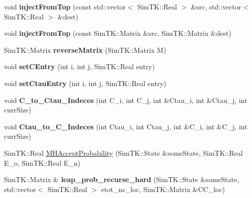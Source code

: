 \begin{DoxyCompactItemize}
\item 
void {\bfseries inject\+From\+Top} (const std\+::vector$<$ Sim\+T\+K\+::\+Real $>$ \&src, std\+::vector$<$ Sim\+T\+K\+::\+Real $>$ \&dest)\hypertarget{classLAHMCSampler_aedd525ca52d9d2a785b851a1480bb0db}{}\label{classLAHMCSampler_aedd525ca52d9d2a785b851a1480bb0db}

\item 
void {\bfseries inject\+From\+Top} (const Sim\+T\+K\+::\+Matrix \&src, Sim\+T\+K\+::\+Matrix \&dest)\hypertarget{classLAHMCSampler_ab0e8be72dae629b8de3e17efe1eea6e8}{}\label{classLAHMCSampler_ab0e8be72dae629b8de3e17efe1eea6e8}

\item 
Sim\+T\+K\+::\+Matrix {\bfseries reverse\+Matrix} (Sim\+T\+K\+::\+Matrix M)\hypertarget{classLAHMCSampler_a6aefd73ab099cdc45a3c999a35871ea0}{}\label{classLAHMCSampler_a6aefd73ab099cdc45a3c999a35871ea0}

\item 
void {\bfseries set\+C\+Entry} (int i, int j, Sim\+T\+K\+::\+Real entry)\hypertarget{classLAHMCSampler_a100856ce2d65a5c3af4a4fa23d03cec2}{}\label{classLAHMCSampler_a100856ce2d65a5c3af4a4fa23d03cec2}

\item 
void {\bfseries set\+Ctau\+Entry} (int i, int j, Sim\+T\+K\+::\+Real entry)\hypertarget{classLAHMCSampler_a9879e684da63e3b2e4a1901358cd6c1e}{}\label{classLAHMCSampler_a9879e684da63e3b2e4a1901358cd6c1e}

\item 
void {\bfseries C\+\_\+to\+\_\+\+Ctau\+\_\+\+Indeces} (int C\+\_\+i, int C\+\_\+j, int \&Ctau\+\_\+i, int \&Ctau\+\_\+j, int curr\+Size)\hypertarget{classLAHMCSampler_a19eb270fc5a18dfd3912f4eb3e8f8c0c}{}\label{classLAHMCSampler_a19eb270fc5a18dfd3912f4eb3e8f8c0c}

\item 
void {\bfseries Ctau\+\_\+to\+\_\+\+C\+\_\+\+Indeces} (int Ctau\+\_\+i, int Ctau\+\_\+j, int \&C\+\_\+i, int \&C\+\_\+j, int curr\+Size)\hypertarget{classLAHMCSampler_a665643ec6077e31d00487df685bb1595}{}\label{classLAHMCSampler_a665643ec6077e31d00487df685bb1595}

\item 
Sim\+T\+K\+::\+Real \hyperlink{classLAHMCSampler_a6a3e967f12c5c64dda41c395bf755e6b}{M\+H\+Accept\+Probability} (Sim\+T\+K\+::\+State \&some\+State, Sim\+T\+K\+::\+Real E\+\_\+o, Sim\+T\+K\+::\+Real E\+\_\+n)
\item 
Sim\+T\+K\+::\+Matrix \& {\bfseries leap\+\_\+prob\+\_\+recurse\+\_\+hard} (Sim\+T\+K\+::\+State \&some\+State, std\+::vector$<$ Sim\+T\+K\+::\+Real $>$ etot\+\_\+ns\+\_\+loc, Sim\+T\+K\+::\+Matrix \&C\+C\+\_\+loc)\hypertarget{classLAHMCSampler_ad41e507cc48b82d7a6b924879a39dec8}{}\label{classLAHMCSampler_ad41e507cc48b82d7a6b924879a39dec8}


\end{DoxyCompactItemize}
